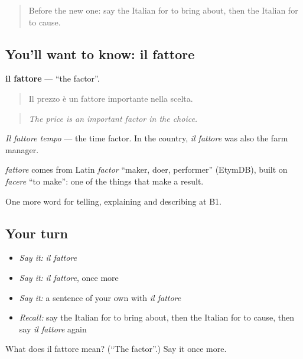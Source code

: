 \begin{quote}
Before the new one: say the Italian for to bring about, then the Italian for to cause.
\end{quote}

\subsection*{You'll want to know: il fattore}
\textbf{il fattore} — \textquotedblleft{}the factor\textquotedblright{}.

\begin{quote}
Il prezzo è un fattore importante nella scelta.
\end{quote}

\begin{quote}
\emph{The price is an important factor in the choice.}
\end{quote}

\emph{Il fattore tempo} — the time factor. In the country, \emph{il fattore} was also the farm manager.

\begin{cousinweb}
\emph{fattore} comes from Latin \emph{factor} \textquotedblleft{}maker, doer, performer\textquotedblright{} (EtymDB), built on \emph{facere} \textquotedblleft{}to make\textquotedblright{}: one of the things that make a result.
\end{cousinweb}

\begin{grammarlens}[title={What you've built}]
One more word for telling, explaining and describing at B1.
\end{grammarlens}

\subsection*{Your turn}
\begin{itemize}
\raggedright
  \item \emph{Say it:} \emph{il fattore}
  \item \emph{Say it:} \emph{il fattore}, once more
  \item \emph{Say it:} a sentence of your own with \emph{il fattore}
  \item \emph{Recall:} say the Italian for to bring about, then the Italian for to cause, then say \emph{il fattore} again
\end{itemize}

\begin{tcolorbox}[breakable,colback=teal!4,colframe=teal!35!black,title={Before you move on}]
What does il fattore mean? (\textquotedblleft{}The factor\textquotedblright{}.) Say it once more.
\end{tcolorbox}
